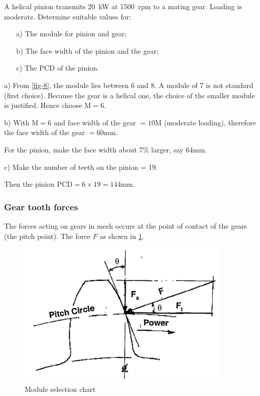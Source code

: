A helical pinion transmits \SI{20}{\kilo\watt} at \SI{1500}{rpm} to a mating gear. Loading is moderate. Determine suitable values for:

\begin{enumerate}
  \item[a)] The module for pinion and gear;
  \item[b)] The face width of the pinion and the gear;
  \item[c)] The PCD of the pinion.
\end{enumerate}

a) From \cref{fig-8}, the module lies between 6 and 8. A module of 7 is not standard (first choice). Because the gear is a helical one, the choice of the smaller module is justified. Hence choose $\text{M} = 6$.

b) With $\text{M}=6$ and face width of the gear $= 10 \text{M}$ (moderate loading), therefore the face width of the gear $= 60\si{\milli\metre}$.

For the pinion, make the face width about 7\% larger, say 64\si{\milli\metre}.

c) Make the number of teeth on the pinion = 19.

Then the pinion $\text{PCD} = 6 \times 19 =144\si{\milli\metre}$.

\subsubsection{Gear tooth forces}

The forces acting on gears in mesh occurs at the point of contact of the gears (the pitch point). The force $F$ as shown in \cref{fig-9}.

\begin{figure}[h!]
    \center
    \includegraphics[width=0.9\textwidth]{figs/fig9.png}
    \caption{Module selection chart}
    \label{fig-9}
\end{figure}


